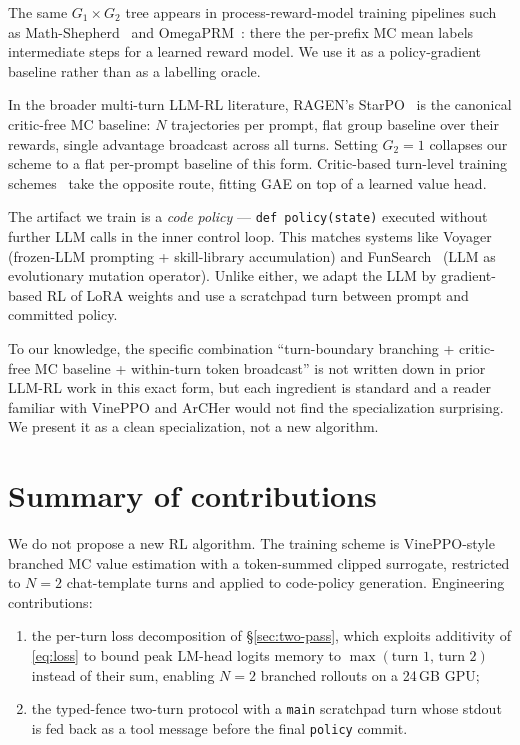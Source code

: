 \documentclass[11pt,a4paper]{article}
\begin{document}
The same $G_1\times G_2$ tree appears in process-reward-model
training pipelines such as
Math-Shepherd~\cite{wang2024mathshepherd} and
OmegaPRM~\cite{luo2024omegaprm}: there the per-prefix MC mean labels
intermediate steps for a learned reward model. We use it as a
policy-gradient baseline rather than as a labelling oracle.

In the broader multi-turn LLM-RL literature, RAGEN's
StarPO~\cite{wang2025ragen} is the canonical critic-free MC baseline:
$N$ trajectories per prompt, flat group baseline over their rewards,
single advantage broadcast across all turns. Setting $G_2=1$
collapses our scheme to a flat per-prompt baseline of this form.
Critic-based turn-level training schemes~\cite{chen2025turn} take the
opposite route, fitting GAE on top of a learned value head.

The artifact we train is a \emph{code policy} ---
\texttt{def policy(state)} executed without further LLM calls in the
inner control loop. This matches systems like
Voyager~\cite{wang2024voyager} (frozen-LLM prompting + skill-library
accumulation) and FunSearch~\cite{romera-paredes2024funsearch} (LLM
as evolutionary mutation operator). Unlike either, we adapt the LLM
by gradient-based RL of LoRA weights and use a scratchpad turn
between prompt and committed policy.

To our knowledge, the specific combination ``turn-boundary branching
+ critic-free MC baseline + within-turn token broadcast'' is not
written down in prior LLM-RL work in this exact form, but each
ingredient is standard and a reader familiar with VinePPO and
ArCHer would not find the specialization surprising. We present it
as a clean specialization, not a new algorithm.

\section{Summary of contributions}

We do not propose a new RL algorithm. The training scheme is
VinePPO-style branched MC value estimation with a token-summed
clipped surrogate, restricted to $N=2$ chat-template turns and
applied to code-policy generation. Engineering contributions:
\begin{enumerate}
  \item the per-turn loss decomposition of \S\ref{sec:two-pass},
        which exploits additivity of \eqref{eq:loss} to bound peak
        LM-head logits memory to $\max(\text{turn 1, turn 2})$
        instead of their sum, enabling $N=2$ branched rollouts on a
        24\,GB GPU;
  \item the typed-fence two-turn protocol with a \texttt{main}
        scratchpad turn whose stdout is fed back as a tool message
        before the final \texttt{policy} commit.
\end{enumerate}
\end{document}
